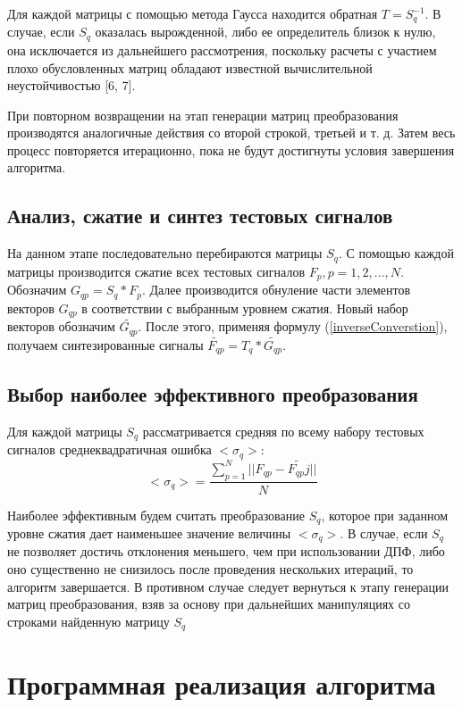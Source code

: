 \documentclass[11pt, oneside, a4paper]{article}
\begin{document}
Для каждой матрицы с помощью метода Гаусса находится обратная $T=S_q^{-1}$. В случае, если $S_q$ оказалась вырожденной, либо ее определитель близок к нулю, она исключается из дальнейшего рассмотрения, поскольку расчеты с участием плохо обусловленных матриц обладают известной вычислительной неустойчивостью [6, 7].

При повторном возвращении на этап генерации матриц преобразования производятся аналогичные действия со второй строкой, третьей и т. д. Затем весь процесс повторяется итерационно, пока не будут достигнуты условия завершения алгоритма. 

\subsection{Анализ, сжатие и синтез тестовых сигналов}

На данном этапе последовательно перебираются матрицы $S_q$. С помощью каждой матрицы производится сжатие всех тестовых сигналов $F_p, p=1,2,...,N$. Обозначим $G_{qp}=S_q*F_p$. Далее производится обнуление части элементов векторов $G_{qp}$ в соответствии с выбранным уровнем сжатия. Новый набор векторов обозначим $\tilde{G_{qp}}$. После этого, применяя формулу (\ref{inverseConverstion}), получаем синтезированные сигналы $\tilde{F_{qp}}=T_q*\tilde{G_{qp}}$.

\subsection{Выбор наиболее эффективного преобразования}

Для каждой матрицы $S_q$ рассматривается средняя по всему набору тестовых сигналов среднеквадратичная ошибка $<\sigma_q>$:
\begin{equation}
\label{squareNormQ}
    <\sigma_q> = \frac{\sum\limits_{p=1}^{N}||F_{qp}-\tilde{F_{qp}j}||}{N}
\end{equation}

Наиболее эффективным будем считать преобразование $S_q$, которое при заданном уровне сжатия дает наименьшее значение величины $<\sigma_q>$. В случае, если $S_q$ не позволяет достичь отклонения  меньшего, чем при использовании ДПФ, либо оно существенно не снизилось после проведения нескольких итераций, то алгоритм завершается. В противном случае следует вернуться к этапу генерации матриц преобразования, взяв за основу при дальнейших манипуляциях со строками найденную матрицу $S_q$

\section{Программная реализация алгоритма}
\end{document}
